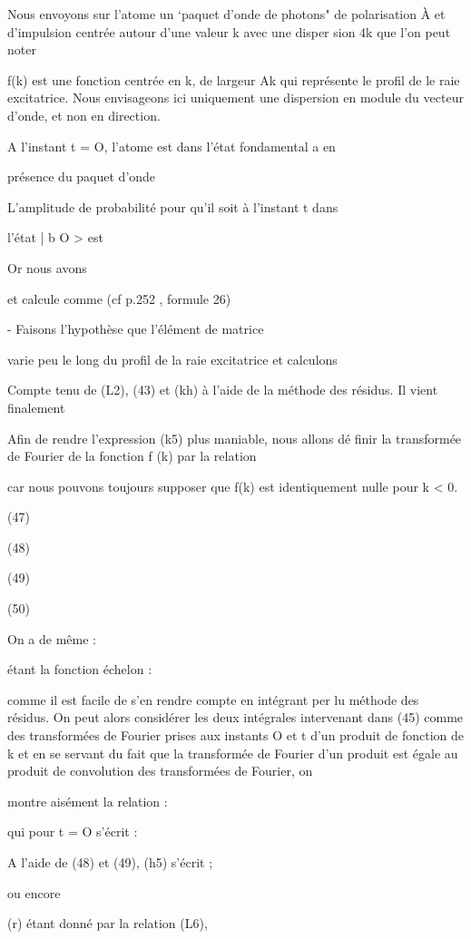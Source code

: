Nous envoyons sur l'atome un ‘paquet d'onde de photons" de
polarisation À et d'impulsion centrée autour d'une valeur k avec une disper
sion 4k que l'on peut noter

f(k) est une fonction centrée en k, de largeur Ak qui représente le profil de
le raie excitatrice. Nous envisageons ici uniquement une dispersion en module
du vecteur d'onde, et non en direction.

A l'instant t = O, l'atome est dans l'état fondamental a en

présence du paquet d'onde

L'amplitude de probabilité pour qu'il soit à l'instant t dans

l'état | b O > est

Or nous avons

et  calcule comme  (cf p.252 , formule 26)

- Faisons l'hypothèse que l'élément de matrice 

varie peu le long du profil de la raie excitatrice et calculons

 Compte tenu de (L2), (43) et (kh) à l'aide de la méthode
des résidus. Il vient finalement

Afin de rendre l'expression (k5) plus maniable, nous allons dé
finir la transformée de Fourier de la fonction f (k) par la relation

car nous pouvons toujours supposer que f(k) est identiquement nulle pour k < 0.

(47)

(48)

(49)

(50)

On a de même :

 étant la fonction échelon : 

comme il est facile de s'en rendre compte en intégrant per lu méthode des
résidus. On peut alors considérer les deux intégrales intervenant dans (45)
comme des transformées de Fourier prises aux instants O et t d'un produit de
fonction de k et en se servant du fait que la transformée de Fourier d'un
produit est égale au produit de convolution des transformées de Fourier, on

montre aisément la relation :

qui pour t = O s'écrit :

A l'aide de (48) et (49), (h5) s'écrit ;

ou encore

(r) étant donné par la relation (L6),

